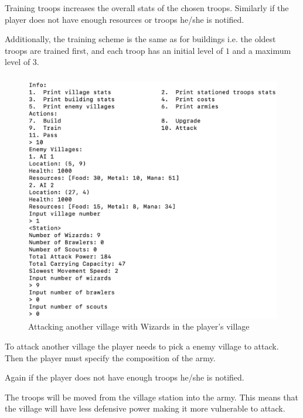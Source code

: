 \documentclass[12pt]{article}
\DeclareRobustCommand{\ul}[1]{%
	\uline{\phantom{#1}}%
	\llap{\contour{white}{#1}}%
}
\begin{document}
Training troops increases the overall stats of the chosen
troops. Similarly if the player does not have enough resources
or troops he/she is notified.

Additionally, the training scheme is the same as for buildings
i.e. the oldest troops are trained first, and each troop has an
initial level of $1$ and a maximum level of $3$.

\subsubsection*{\ul{Attacking}}

\begin{figure}[H]
    \centering
    \includegraphics[width=12cm]{./images/attacking-village-war-game.png}
    \caption{Attacking another village with Wizards in the player's village}
    \label{attacking-village-war-game}
\end{figure}

To attack another village the player needs to pick a enemy
village to attack. Then the player must specify the composition
of the army.

Again if the player does not have enough troops he/she is
notified.

The troops will be moved from the village station into the army.
This means that the village will have less defensive power
making it more vulnerable to attack.
\end{document}
